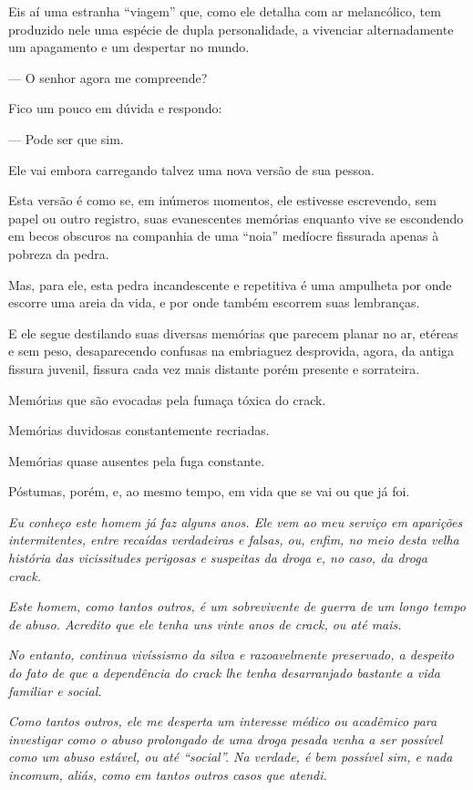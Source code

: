 Eis aí uma estranha ``viagem'' que, como ele detalha com ar melancólico,
tem produzido nele uma espécie de dupla personalidade, a vivenciar
alternadamente um apagamento e um despertar no mundo.

— O senhor agora me compreende?

Fico um pouco em dúvida e respondo:

— Pode ser que sim.

Ele vai embora carregando talvez uma nova versão de sua pessoa.

Esta versão é como se, em inúmeros momentos, ele estivesse escrevendo,
sem papel ou outro registro, suas evanescentes memórias enquanto vive se
escondendo em becos obscuros na companhia de uma ``noia'' medíocre
fissurada apenas à pobreza da pedra.

Mas, para ele, esta pedra incandescente e repetitiva é uma ampulheta por
onde escorre uma areia da vida, e por onde também escorrem suas
lembranças.

E ele segue destilando suas diversas memórias que parecem planar no ar,
etéreas e sem peso, desaparecendo confusas na embriaguez desprovida,
agora, da antiga fissura juvenil, fissura cada vez mais distante porém
presente e sorrateira.

Memórias que são evocadas pela fumaça tóxica do crack.

Memórias duvidosas constantemente recriadas.

Memórias quase ausentes pela fuga constante.

Póstumas, porém, e, ao mesmo tempo, em vida que se vai ou que já foi.

\begin{center}\asterisc{}\end{center}
\begingroup\small

\emph{Eu conheço este homem já faz alguns anos. Ele vem ao meu serviço
em aparições intermitentes, entre recaídas verdadeiras e falsas, ou,
enfim, no meio desta velha história das vicissitudes perigosas e
suspeitas da droga e, no caso, da droga crack.}~

\emph{Este homem, como tantos outros, é um sobrevivente de guerra de um
longo tempo de abuso. Acredito que ele tenha uns vinte anos de crack, ou
até mais.}~

\emph{No entanto, continua vivíssismo da silva e razoavelmente
preservado, a despeito do fato de que a dependência do crack lhe tenha
desarranjado bastante a vida familiar e social.}~

\emph{Como tantos outros, ele me desperta um interesse médico ou
acadêmico para investigar como o abuso prolongado de uma droga pesada
venha a ser possível como um abuso estável, ou até ``social''. Na
verdade, é bem possível sim, e nada incomum, aliás, como em tantos outros
casos que atendi.}~

